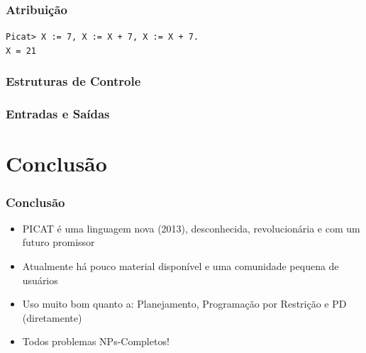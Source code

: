 \documentclass[10pt]{beamer}
\begin{document}

\begin{frame}
    \frametitle{Atribuição}
     \texttt{Picat> X := 7, X := X + 7, X := X + 7.}\\
     \texttt{X = 21}
\end{frame}


\begin{frame}
    \frametitle{Estruturas de Controle}
        
     
    
\end{frame}


\begin{frame}
    \frametitle{Entradas e Saídas}
  
  
  
  
\end{frame}



\section{Conclusão}
\begin{frame}
    \frametitle{Conclusão}
    \begin{itemize}
    \item PICAT é uma linguagem nova (2013), 
    desconhecida, revolucionária e com um futuro promissor
    
    \item Atualmente há pouco material disponível e uma comunidade pequena de usuários

    \item Uso muito bom quanto a: Planejamento, Programação por Restrição e PD (diretamente)
    
    \item Todos problemas NPs-Completos!
    \end{itemize}
\end{frame}
\end{document}
